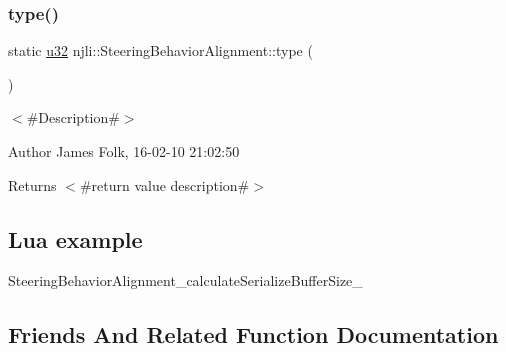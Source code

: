 \mbox{\label{classnjli_1_1_steering_behavior_alignment_acad2dfa2c57e80058ac1916e5adda54e}} 
\subsubsection{\texorpdfstring{type()}{type()}}
{\footnotesize\ttfamily static \mbox{\hyperlink{_util_8h_a10e94b422ef0c20dcdec20d31a1f5049}{u32}} njli\+::\+Steering\+Behavior\+Alignment\+::type (\begin{DoxyParamCaption}{ }\end{DoxyParamCaption})\hspace{0.3cm}{\ttfamily [static]}}



$<$\#\+Description\#$>$ 

\begin{DoxyAuthor}{Author}
James Folk, 16-\/02-\/10 21\+:02\+:50
\end{DoxyAuthor}
\begin{DoxyReturn}{Returns}
$<$\#return value description\#$>$
\end{DoxyReturn}
\hypertarget{classnjli_1_1_steering_behavior_wander_ex1}{}\subsection{Lua example}\label{classnjli_1_1_steering_behavior_wander_ex1}

\begin{DoxyCodeInclude}
\end{DoxyCodeInclude}
Steering\+Behavior\+Alignment\+\_\+calculate\+Serialize\+Buffer\+Size\+\_\+ 

\subsection{Friends And Related Function Documentation}
\mbox{\label{classnjli_1_1_steering_behavior_alignment_acb96ebb09abe8f2a37a915a842babfac}} 
